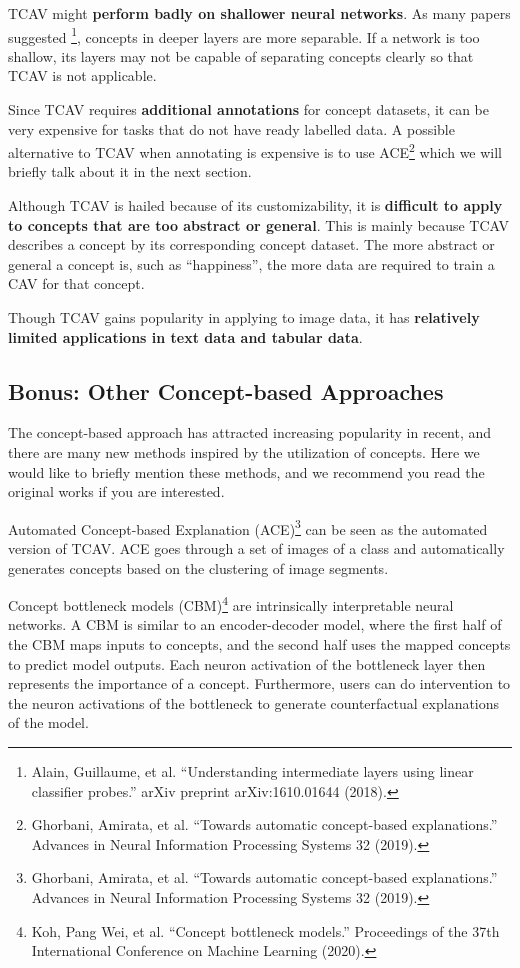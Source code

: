 \documentclass[12pt,]{krantz}
\begin{document}
TCAV might \textbf{perform badly on shallower neural networks}. As many
papers suggested \footnote{Alain, Guillaume, et al. ``Understanding
  intermediate layers using linear classifier probes.'' arXiv preprint
  arXiv:1610.01644 (2018).}, concepts in deeper layers are more
separable. If a network is too shallow, its layers may not be capable of
separating concepts clearly so that TCAV is not applicable.

Since TCAV requires \textbf{additional annotations} for concept
datasets, it can be very expensive for tasks that do not have ready
labelled data. A possible alternative to TCAV when annotating is
expensive is to use ACE\footnote{Ghorbani, Amirata, et al. ``Towards
  automatic concept-based explanations.'' Advances in Neural Information
  Processing Systems 32 (2019).} which we will briefly talk about it in
the next section.

Although TCAV is hailed because of its customizability, it is
\textbf{difficult to apply to concepts that are too abstract or
general}. This is mainly because TCAV describes a concept by its
corresponding concept dataset. The more abstract or general a concept
is, such as ``happiness'', the more data are required to train a CAV for
that concept.

Though TCAV gains popularity in applying to image data, it has
\textbf{relatively limited applications in text data and tabular data}.

\subsection{Bonus: Other Concept-based
Approaches}\label{bonus-other-concept-based-approaches}

The concept-based approach has attracted increasing popularity in
recent, and there are many new methods inspired by the utilization of
concepts. Here we would like to briefly mention these methods, and we
recommend you read the original works if you are interested.

Automated Concept-based Explanation (ACE)\footnote{Ghorbani, Amirata, et
  al. ``Towards automatic concept-based explanations.'' Advances in
  Neural Information Processing Systems 32 (2019).} can be seen as the
automated version of TCAV. ACE goes through a set of images of a class
and automatically generates concepts based on the clustering of image
segments.

Concept bottleneck models (CBM)\footnote{Koh, Pang Wei, et al. ``Concept
  bottleneck models.'' Proceedings of the 37th International Conference
  on Machine Learning (2020).} are intrinsically interpretable neural
networks. A CBM is similar to an encoder-decoder model, where the first
half of the CBM maps inputs to concepts, and the second half uses the
mapped concepts to predict model outputs. Each neuron activation of the
bottleneck layer then represents the importance of a concept.
Furthermore, users can do intervention to the neuron activations of the
bottleneck to generate counterfactual explanations of the model.
\end{document}
